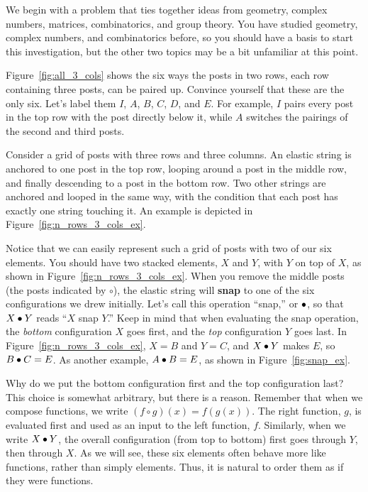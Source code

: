 \documentclass[../gatm.tex]{subfiles}
\begin{document}

\noindent We begin with a problem that ties together ideas from geometry, complex numbers, matrices, combinatorics, and group theory.
You have studied geometry, complex numbers, and combinatorics before, so you should have a basis to start this investigation, but the other two topics may be a bit unfamiliar at this point.

Figure~\ref{fig:all_3_cols} shows the six ways the posts in two rows, each row containing three posts, can be paired up. Convince yourself that these are the only six. Let's label them $I$, $A$, $B$, $C$, $D$, and $E$. For example, $I$ pairs every post in the top row with the post directly below it, while $A$ switches the pairings of the second and third posts.

Consider a grid of posts with three rows and three columns.
An elastic string is anchored to one post in the top row, looping around a post in the middle row, and finally descending to a post in the bottom row.
Two other strings are anchored and looped in the same way, with the condition that each post has exactly one string touching it.
An example is depicted in Figure~\ref{fig:n_rows_3_cols_ex}.

Notice that we can easily represent such a grid of posts with two of our six elements. You should have two stacked elements, $X$ and $Y$, with $Y$ on top of $X$, as shown in Figure~\ref{fig:n_rows_3_cols_ex}.
When you remove the middle posts (the posts indicated by $\circ$), the elastic string will \textbf{snap} to one of the six configurations we drew initially.
Let's call this operation ``snap,'' or $\bullet$, so that $X\bullet Y$ reads ``$X$ snap $Y$.''
Keep in mind that when evaluating the snap operation, the \textit{bottom} configuration $X$ goes first, and the \textit{top} configuration $Y$ goes last.
In Figure~\ref{fig:n_rows_3_cols_ex}, $X=B$ and $Y=C$, and $X\bullet Y$ makes $E$, so $B\bullet C = E$.
As another example, $A\bullet B = E$, as shown in Figure~\ref{fig:snap_ex}.

Why do we put the bottom configuration first and the top configuration last? This choice is somewhat arbitrary, but there is a reason. Remember that when we compose functions, we write $(f \circ g)(x)=f(g(x))$. The right function, $g$, is evaluated first and used as an input to the left function, $f$. Similarly, when we write $X\bullet Y$, the overall configuration (from top to bottom) first goes through $Y$, then through $X$. As we will see, these six elements often behave more like functions, rather than simply elements. Thus, it is natural to order them as if they were functions.
\end{document}
